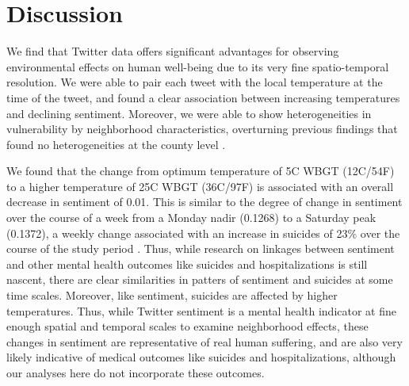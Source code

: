 \documentclass[fleqn,10pt]{wlscirep}
\begin{document}
\section*{Discussion}
We find that Twitter data offers significant advantages for observing environmental effects on human well-being due to its very fine spatio-temporal resolution. We were able to pair each tweet with the local temperature at the time of the tweet, and found a clear association between increasing temperatures and declining sentiment. Moreover, we were able to show heterogeneities in vulnerability by neighborhood characteristics, overturning previous findings that found no heterogeneities at the county level \cite{Burke2018Aug, Mullins2019Dec}.

We found that the change from optimum temperature of 5\textdegree C WBGT (12\textdegree C/54\textdegree F) to a higher temperature of 25\textdegree C WBGT (36\textdegree C/97\textdegree F) is associated with an overall decrease in sentiment of 0.01.  This is similar to the degree of change in sentiment over the course of a week from a Monday nadir (0.1268) to a Saturday peak (0.1372), a weekly change associated with an increase in suicides of 23\% over the course of the study period \cite{CDC2021}. Thus, while research on linkages between sentiment and other mental health outcomes like suicides and hospitalizations is still nascent, there are clear similarities in patters of sentiment and suicides at some time scales. Moreover, like sentiment, suicides are affected by higher temperatures. Thus, while Twitter sentiment is a mental health indicator at fine enough spatial and temporal scales to examine neighborhood effects, these changes in sentiment are representative of real human suffering, and are also very likely indicative of medical outcomes like suicides and hospitalizations, although our analyses here do not incorporate these outcomes.
\end{document}

